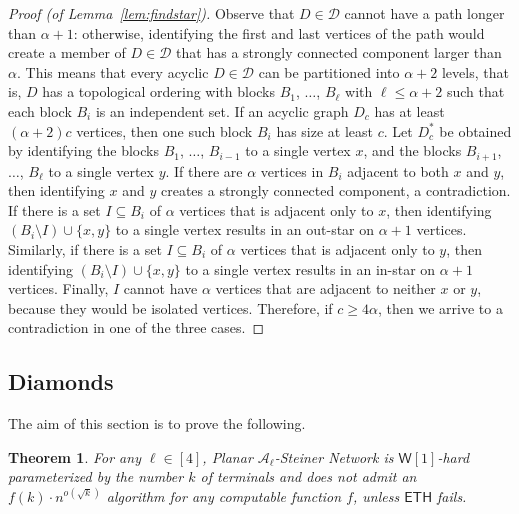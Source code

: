 \documentclass[a4paper,11pt]{article}
\newcommand{\calD}{\mathcal{D}}
\theoremstyle{plain}
\newtheorem{theorem}{Theorem}[section]
\newtheorem{identification rule}{Identification Rule}
\theoremstyle{definition}
\theoremstyle{remark}
\newcommand{\oldC}{\mathcal{A}}
\begin{document}
\begin{proof}[Proof (of Lemma~\ref{lem:findstar})]
Observe that $D\in\calD$ cannot have a path longer than $\alpha+1$: otherwise, identifying the first and last vertices of the path would create a member of $D\in\calD$ that has a strongly connected component larger than $\alpha$. This means that every acyclic $D\in \calD$ can be partitioned into $\alpha+2$ levels, that is, $D$ has a topological ordering with blocks $B_1$, $\dots$, $B_\ell$ with $\ell\le \alpha+2$ such that each block $B_i$ is an independent set. If an acyclic graph $D_c$ has at least $(\alpha+2)c$ vertices, then one such block $B_i$ has size at least $c$. Let $D^*_c$ be obtained by identifying the blocks $B_1$, $\dots$, $B_{i-1}$ to a single vertex $x$, and the blocks $B_{i+1}$, $\dots$, $B_\ell$ to a single vertex $y$. If there are $\alpha$ vertices in $B_i$ adjacent to both $x$ and $y$, then identifying $x$ and $y$ creates a strongly connected component, a contradiction. If there is a set $I\subseteq B_i$ of  $\alpha$ vertices that is adjacent only to $x$, then identifying $(B_i\setminus I)\cup \{x,y\}$ to a single vertex results in an out-star on $\alpha+1$ vertices. Similarly, if there is a set $I\subseteq B_i$ of  $\alpha$ vertices that is adjacent only to $y$, then identifying $(B_i\setminus I)\cup \{x,y\}$ to a single vertex results in an in-star on $\alpha+1$ vertices. Finally, $I$ cannot have $\alpha$ vertices that are adjacent to neither $x$ or $y$, because they would be isolated vertices. Therefore, if $c\ge 4\alpha$, then we arrive to a contradiction in one of the three cases. 
\end{proof}
\subsection{Diamonds}
\label{sec:diamonds}

The aim of this section is to prove the following.

\begin{theorem}
\label{thm:diamond}
For any $\ell \in [4]$, {\sc Planar $\oldC_\ell$-Steiner Network} is $\mathsf{W}[1]$-hard parameterized by the number $k$ of terminals and 
does not admit an $f(k) \cdot n^{o(\sqrt{k})}$ algorithm for any computable function $f$,
unless $\mathsf{ETH}$ fails.
\end{theorem}
\end{document}
